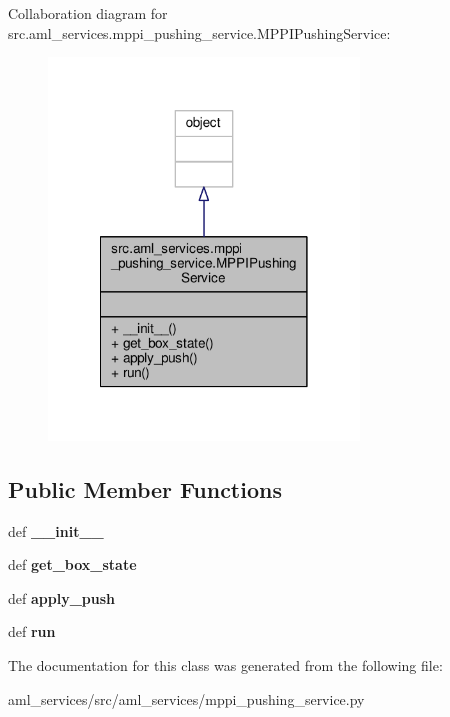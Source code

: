 Collaboration diagram for src.\-aml\-\_\-services.\-mppi\-\_\-pushing\-\_\-service.\-M\-P\-P\-I\-Pushing\-Service\-:\nopagebreak
\begin{figure}[H]
\begin{center}
\leavevmode
\includegraphics[width=234pt]{classsrc_1_1aml__services_1_1mppi__pushing__service_1_1_m_p_p_i_pushing_service__coll__graph}
\end{center}
\end{figure}
\subsection*{Public Member Functions}
\begin{DoxyCompactItemize}
\item 
\hypertarget{classsrc_1_1aml__services_1_1mppi__pushing__service_1_1_m_p_p_i_pushing_service_a64a6e9a835bacadc2f0b7e5f71d9499b}{def {\bfseries \-\_\-\-\_\-init\-\_\-\-\_\-}}\label{classsrc_1_1aml__services_1_1mppi__pushing__service_1_1_m_p_p_i_pushing_service_a64a6e9a835bacadc2f0b7e5f71d9499b}

\item 
\hypertarget{classsrc_1_1aml__services_1_1mppi__pushing__service_1_1_m_p_p_i_pushing_service_aba3fff172cd17d88054c25692b3342db}{def {\bfseries get\-\_\-box\-\_\-state}}\label{classsrc_1_1aml__services_1_1mppi__pushing__service_1_1_m_p_p_i_pushing_service_aba3fff172cd17d88054c25692b3342db}

\item 
\hypertarget{classsrc_1_1aml__services_1_1mppi__pushing__service_1_1_m_p_p_i_pushing_service_a65c5883ef22d9591b2ce076facf1bf1b}{def {\bfseries apply\-\_\-push}}\label{classsrc_1_1aml__services_1_1mppi__pushing__service_1_1_m_p_p_i_pushing_service_a65c5883ef22d9591b2ce076facf1bf1b}

\item 
\hypertarget{classsrc_1_1aml__services_1_1mppi__pushing__service_1_1_m_p_p_i_pushing_service_a626d4c8d2c9cb0f1efe1c645ae5a902d}{def {\bfseries run}}\label{classsrc_1_1aml__services_1_1mppi__pushing__service_1_1_m_p_p_i_pushing_service_a626d4c8d2c9cb0f1efe1c645ae5a902d}

\end{DoxyCompactItemize}


The documentation for this class was generated from the following file\-:\begin{DoxyCompactItemize}
\item 
aml\-\_\-services/src/aml\-\_\-services/mppi\-\_\-pushing\-\_\-service.\-py\end{DoxyCompactItemize}
